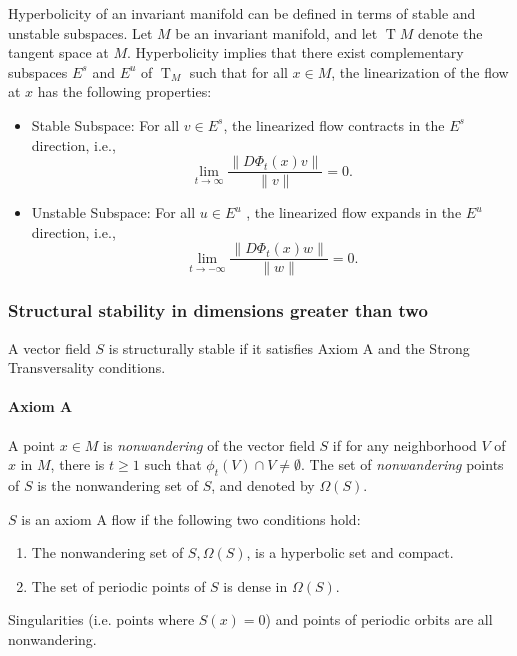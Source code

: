 \documentclass{article}
\newcommand{\T}{\operatorname{T}}
\newcommand{\TM}{\T\!M}
\newcounter{ct}
\begin{document}
Hyperbolicity of an invariant manifold can be defined in terms of stable and unstable subspaces. Let $M$ be an invariant manifold, and let $\TM$  denote the tangent space at $M$. Hyperbolicity implies that there exist complementary subspaces $E^s$  and $E^u$  of $\T_M$  such that for all $x\in M$, the linearization of the flow at $x$ has the following properties:
\begin{itemize}
\item Stable Subspace: For all $v\in E^s$, the linearized flow contracts in the $E^s$  direction, i.e., \[\lim_{t \to \infty} \frac{\|D\Phi_t(x)v\|}{\|v\|} = 0.\]
\item Unstable Subspace: For all $u\in E^u$ , the linearized flow expands in the $E^u$ direction, i.e., \[\lim_{t \to -\infty} \frac{\|D\Phi_t(x)w\|}{\|w\|} = 0.\]
\end{itemize}


\subsubsection{Structural stability in dimensions greater than two}
\begin{theorem}\label{theorem:ss}
A vector field $S$ is structurally stable if it satisfies Axiom A and the Strong Transversality conditions.
\end{theorem}

\paragraph{Axiom A}
A point $x\in M$ is \emph{nonwandering} of the vector field $S$ if for any neighborhood $V$ of $x$ in $M$, there is $t\geq 1$ such that $\phi_t(V) \cap V\neq \emptyset$. The set of \emph{nonwandering} points of $S$ is the nonwandering set of $S$, and denoted by $\Omega(S)$. 

\begin{definition}
$S$ is an axiom A flow if the following two conditions hold:
\begin{enumerate}
\item The nonwandering set of $S, \Omega(S)$, is a hyperbolic set and compact.
\item The set of periodic points of $S$ is dense in $\Omega(S)$.
\end{enumerate}
\end{definition}

Singularities (i.e. points where $S(x)=0$) and points of periodic orbits are all nonwandering.
\end{document}
